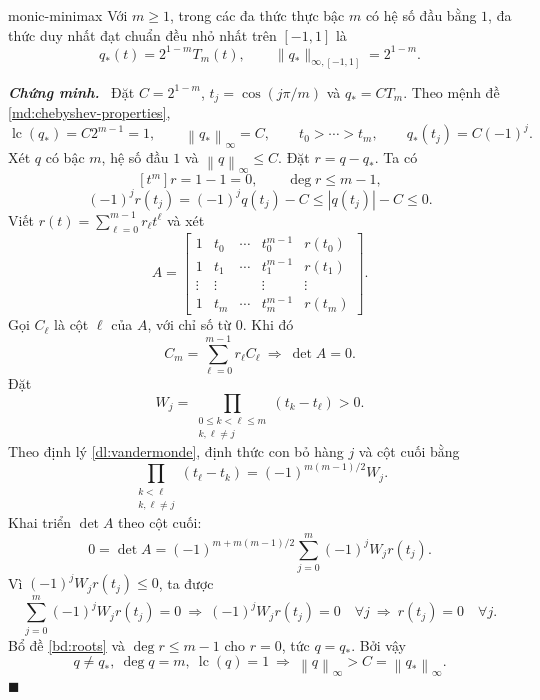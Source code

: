 \documentclass[12pt,a4paper,oneside]{book}
\numberwithin{algorithm}{chapter}
\theoremstyle{definition}
\newenvironment{chungminh}{\par\medskip\noindent\textbf{\textit{\color{mainblue}Chứng minh.}}\ }{\hfill$\blacksquare$\par\medskip}
\newcommand{\norminf}[1]{\left\lVert #1\right\rVert_{\infty}}
\newcommand{\lc}{\operatorname{lc}}
\begin{document}
\begin{dinhly}{}{monic-minimax}
Với $m\geq1$, trong các đa thức thực bậc $m$ có hệ số đầu bằng $1$, đa thức duy nhất đạt chuẩn đều nhỏ nhất trên $[-1,1]$ là
\[
 q_*(t)=2^{1-m}T_m(t),\qquad
 \lVert q_*\rVert_{\infty,[-1,1]}=2^{1-m}.
\]
\end{dinhly}
\begin{chungminh}
Đặt $C=2^{1-m}$, $t_j=\cos(j\pi/m)$ và $q_*=CT_m$. Theo mệnh đề \ref{md:chebyshev-properties},
\[
 \lc(q_*)=C2^{m-1}=1,\qquad\norminf{q_*}=C,
 \qquad t_0>\cdots>t_m,\qquad q_*(t_j)=C(-1)^j.
\]
Xét $q$ có bậc $m$, hệ số đầu $1$ và $\norminf q\leq C$. Đặt $r=q-q_*$. Ta có
\[
 [t^m]r=1-1=0,\qquad\deg r\leq m-1,
\]
\[
 (-1)^j r(t_j)=(-1)^j q(t_j)-C\leq|q(t_j)|-C\leq0.
\]
Viết $r(t)=\sum_{\ell=0}^{m-1}r_\ell t^\ell$ và xét
\[
 A=\begin{bmatrix}
 1&t_0&\cdots&t_0^{m-1}&r(t_0)\\
 1&t_1&\cdots&t_1^{m-1}&r(t_1)\\
 \vdots&\vdots&&\vdots&\vdots\\
 1&t_m&\cdots&t_m^{m-1}&r(t_m)
 \end{bmatrix}.
\]
Gọi $C_\ell$ là cột $\ell$ của $A$, với chỉ số từ $0$. Khi đó
\[
 C_m=\sum_{\ell=0}^{m-1}r_\ell C_\ell
 \ \Longrightarrow\ \det A=0.
\]
Đặt
\[
 W_j=\prod_{\substack{0\leq k<\ell\leq m\\k,\ell\ne j}}(t_k-t_\ell)>0.
\]
Theo định lý \ref{dl:vandermonde}, định thức con bỏ hàng $j$ và cột cuối bằng
\[
 \prod_{\substack{k<\ell\\k,\ell\ne j}}(t_\ell-t_k)
 =(-1)^{m(m-1)/2}W_j.
\]
Khai triển $\det A$ theo cột cuối:
\[
 0=\det A=(-1)^{m+m(m-1)/2}
 \sum_{j=0}^{m}(-1)^jW_jr(t_j).
\]
Vì $(-1)^jW_jr(t_j)\leq0$, ta được
\[
 \sum_{j=0}^{m}(-1)^jW_jr(t_j)=0
 \ \Longrightarrow\ (-1)^jW_jr(t_j)=0\quad\forall j
 \ \Longrightarrow\ r(t_j)=0\quad\forall j.
\]
Bổ đề \ref{bd:roots} và $\deg r\leq m-1$ cho $r=0$, tức $q=q_*$. Bởi vậy
\[
 q\ne q_*,\ \deg q=m,\ \lc(q)=1
 \ \Longrightarrow\ \norminf q>C=\norminf{q_*}.
\]
\end{chungminh}
\end{document}
